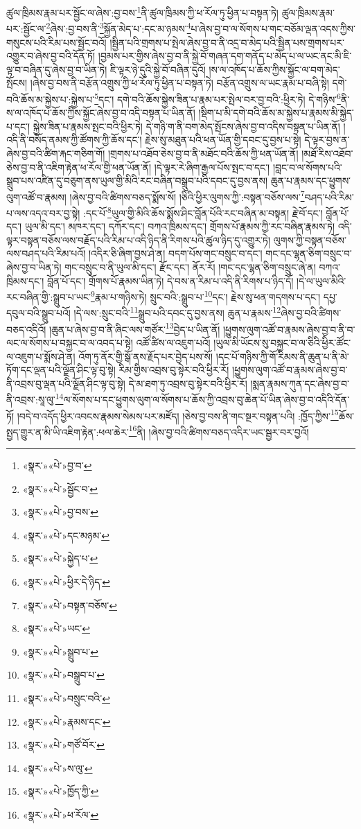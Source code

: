 ཚུལ་ཁྲིམས་རྣམ་པར་སྦྱོང་ལ་ཞེས་:བྱ་བས་\footnote{«སྣར་»«པེ་»བྱ་བ་}ནི་ཚུལ་ཁྲིམས་ཀྱི་ཕ་རོལ་ཏུ་ཕྱིན་པ་བསྟན་ཏེ། ཚུལ་ཁྲིམས་རྣམ་པར་:སྦྱོང་ལ་\footnote{«སྣར་»«པེ་»སྦྱོང་བ་}ཞེས་:བྱ་བས་ནི་\footnote{«སྣར་»«པེ་»བྱ་བས་}སྐྱོན་མེད་པ་:དང་མ་ཉམས་\footnote{«སྣར་»«པེ་»དང་མཉམ་}པ་ཞེས་བྱ་བ་ལ་སོགས་པ་གང་བཅོམ་ལྡན་འདས་ཀྱིས་གསུངས་པའི་རིམ་པས་སྦྱོང་བའོ། །སྦྱིན་པའི་གྲགས་པ་སྤེལ་ཞེས་བྱ་བ་ནི་འདྲ་བ་མེད་པའི་སྦྱིན་པས་གྲགས་པར་འགྱུར་བ་ཞེས་བྱ་བའི་དོན་ཏོ། །བྱམས་པར་གྱིས་ཞེས་བྱ་བ་ནི་སྐྱེ་བོ་གཞན་དག་གནོད་པ་མེད་པ་ལ་ཡང་ནང་མི་ཇི་ལྟ་བ་བཞིན་དུ་ཞེས་བྱ་བ་ཡིན་ཏེ། ཇི་ལྟར་ཉེ་དུའི་སྐྱེ་བོ་བཞིན་དུའོ། །ས་ལ་འཁོད་པ་ཆོས་ཀྱིས་སྐྱོང་ལ་བག་མེད་སྤོངས། །ཞེས་བྱ་བས་ནི་བརྩོན་འགྲུས་ཀྱི་ཕ་རོལ་ཏུ་ཕྱིན་པ་བསྟན་ཏེ། བརྩོན་འགྲུས་ལ་ཡང་རྣམ་པ་བཞི་སྟེ། དགེ་བའི་ཆོས་མ་སྐྱེས་པ་:སྐྱེས་པ་\footnote{«སྣར་»«པེ་»སྐྱེད་པ་}དང་། དགེ་བའི་ཆོས་སྐྱེས་ཟིན་པ་རྣམ་པར་སྤེལ་བར་བྱ་བའི་:ཕྱིར་ཏེ། དེ་གཉིས་\footnote{«སྣར་»«པེ་»ཕྱིར་དེ་ཉིད་}ནི་ས་ལ་འཁོད་པ་ཆོས་ཀྱིས་སྐྱོང་ཞེས་བྱ་བ་འདི་བསྟན་པ་ཡིན་ནོ། །སྡིག་པ་མི་དགེ་བའི་ཆོས་མ་སྐྱེས་པ་རྣམས་མི་སྐྱེད་པ་དང་། སྐྱེས་ཟིན་པ་རྣམས་སྤང་བའི་ཕྱིར་ཏེ། དེ་གཉི་ག་ནི་བག་མེད་སྤོངས་ཞེས་བྱ་བ་འདིས་བསྟན་པ་ཡིན་ནོ། །འདི་ནི་བསོད་ནམས་ཀྱི་ཚོགས་ཀྱི་ཆོས་དང་། རྗེས་སུ་མཐུན་པའི་ཕན་ཡོན་གྱི་དབང་དུ་བྱས་པ་སྟེ། དེ་ལྟར་བྱས་ན་ཞེས་བྱ་བའི་ཚིག་རྐང་གཅིག་གོ། །གྲགས་པ་འཐོབ་ཅེས་བྱ་བ་ནི་མཐོང་བའི་ཆོས་ཀྱི་ཕན་ཡོན་ནོ། །མཐོ་རིས་འཐོབ་ཅེས་བྱ་བ་ནི་འཇིག་རྟེན་ཕ་རོལ་གྱི་ཕན་ཡོན་ནོ། །དེ་ལྟར་རེ་ཞིག་རྒྱལ་པོས་སྤང་བ་དང་། །བླང་བ་ལ་སོགས་པའི་སྒྲུབ་པས་འཛིན་དུ་བཅུག་ནས་ཡུལ་གྱི་མིའི་རང་བཞིན་བསྒྲུབ་པའི་དབང་དུ་བྱས་ནས། ཆུན་པ་རྣམས་དང་ཕྱུགས་ལུག་འཚོ་བ་རྣམས། །ཞེས་བྱ་བའི་ཚིགས་བཅད་སྨོས་སོ། །ཅིའི་ཕྱིར་ལུགས་ཀྱི་:བསྟན་བཅོས་ལས་\footnote{«སྣར་»«པེ་»བསྟན་བཅོས་}བཤད་པའི་རིམ་པ་ལས་འདའ་བར་བྱ་སྟེ། :དང་པོ་\footnote{«སྣར་»«པེ་»ཡང་}ཡུལ་གྱི་མིའི་ཆོས་སྨོས་ཤིང་བློན་པོའི་རང་བཞིན་མ་བསྟན། རྗེ་བོ་དང་། བློན་པོ་དང་། ཡུལ་མི་དང་། མཁར་དང་། དཀོར་དང་། བཀའ་ཁྲིམས་དང་། གྲོགས་པོ་རྣམས་ཀྱི་རང་བཞིན་རྣམས་ཏེ། འདི་ལྟར་བསྟན་བཅོས་ལས་བརྗོད་པའི་རིམ་པ་འདི་ཉིད་ནི་རིགས་པའི་ཚུལ་ཉིད་དུ་འགྱུར་ཏེ། ལུགས་ཀྱི་བསྟན་བཅོས་ལས་བཤད་པའི་རིམ་པའོ། །འདིར་ཅི་ཞིག་བྱས་ཤེ་ན། བདག་པོས་གང་བསྲུང་བ་དང་། གང་དང་ལྷན་ཅིག་བསྲུང་བ་ཞེས་བྱ་བ་ཡིན་ཏེ། གང་བསྲུང་བ་ནི་ཡུལ་མི་དང་། རྫོང་དང་། ནོར་རོ། །གང་དང་ལྷན་ཅིག་བསྲུང་ཞེ་ན། བཀའ་ཁྲིམས་དང་། བློན་པོ་དང་། གྲོགས་པོ་རྣམས་ཡིན་ཏེ། དེ་བས་ན་རིམ་པ་འདི་ནི་རིགས་པ་ཉིད་དོ། །དེ་ལ་ཡུལ་མིའི་རང་བཞིན་གྱི་:སྒྲུབ་པ་ཡང་\footnote{«སྣར་»«པེ་»སྒྲུབ་པ་}རྣམ་པ་གཉིས་ཏེ། སྲུང་བའི་:སྒྲུབ་པ་\footnote{«སྣར་»«པེ་»བསྒྲུབ་པ་}དང་། རྗེས་སུ་ཕན་གདགས་པ་དང་། དཔྱ་དབུལ་བའི་སྒྲུབ་པའོ། །དེ་ལས་:སྲུང་བའི་\footnote{«སྣར་»«པེ་»བསྲུང་བའི་}སྒྲུབ་པའི་དབང་དུ་བྱས་ནས། ཆུན་པ་རྣམས་\footnote{«སྣར་»«པེ་»རྣམས་དང་}ཞེས་བྱ་བའི་ཚིགས་བཅད་འདིའོ། །ཆུན་པ་ཞེས་བྱ་བ་ནི་ཞིང་ལས་གཙོར་\footnote{«སྣར་»«པེ་»གཙོ་བོར་}བྱེད་པ་ཡིན་ནོ། །ཕྱུགས་ལུག་འཚོ་བ་རྣམས་ཞེས་བྱ་བ་ནི་བ་ལང་ལ་སོགས་པ་བསྐྱང་བ་ལ་འབད་པ་སྟེ། འཚོ་ཚིས་ལ་འཇུག་པའོ། །ཡུལ་མི་ཡོངས་སུ་བསྐྱང་བ་ལ་ཅིའི་ཕྱིར་ཚོང་ལ་འཇུག་པ་སྨོས་ཤེ་ན། འོག་ཏུ་ནོར་གྱི་སྒོ་ནས་རྗོད་པར་བྱེད་པས་སོ། །དང་པོ་གཉིས་ཀྱི་གོ་རིམས་ནི་ཆུན་པ་ནི་མེ་ཏོག་དང་ལྡན་པའི་ལྗོན་ཤིང་ལྟ་བུ་སྟེ། རིམ་གྱིས་འབྲས་བུ་སྟེར་བའི་ཕྱིར་རོ། །ཕྱུགས་ལུག་འཚོ་བ་རྣམས་ཞེས་བྱ་བ་ནི་འབྲས་བུ་ལྡན་པའི་ལྗོན་ཤིང་ལྟ་བུ་སྟེ། དེ་མ་ཐག་ཏུ་འབྲས་བུ་སྟེར་བའི་ཕྱིར་རོ། །སྨན་རྣམས་ཀུན་དང་ཞེས་བྱ་བ་ནི་འབྲས་:སཱ་ལུ་\footnote{«སྣར་»«པེ་»ས་ལུ་}ལ་སོགས་པ་དང་ཕྱུགས་ལུག་ལ་སོགས་པ་ཆོས་ཀྱི་འབྲས་བུ་ཆེན་པོ་ཡིན་ཞེས་བྱ་བ་འདིའི་དོན་ཏོ། །བདེ་བ་འདོད་ཕྱིར་འབངས་རྣམས་སེམས་པར་མཛོད། །ཅེས་བྱ་བས་ནི་གང་སྔར་བསྟན་པའི། :ཁྱོད་ཀྱིས་\footnote{«སྣར་»«པེ་»ཁྱོད་ཀྱི་}ཆོས་སྤྱད་གྱུར་ན་མི་ཡི་འཇིག་རྟེན་:ཕལ་ཆེར་\footnote{«སྣར་»«པེ་»ཕ་རོལ་}ནི། །ཞེས་བྱ་བའི་ཚིགས་བཅད་འདིར་ཡང་སྦྱར་བར་བྱའོ། 